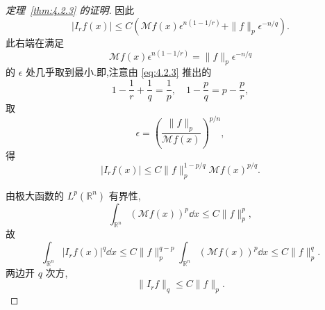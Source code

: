 \begin{proof}[定理~\ref{thm:4.2.3} 的证明]
因此
\begin{equation}
|I_{r}f(x)| \leq C\left(\mathcal{M}f(x)\epsilon^{n(1-1/r)} + \|f\|_{p}\epsilon^{-n/q}\right).\tag{4.2.5}
\label{eq:4.2.5}\end{equation}
此右端在满足
\begin{equation*}
\mathcal{M}f(x)\epsilon^{n(1-1/r)} = \|f\|_{p}\epsilon^{-n/q}
\end{equation*}
的 $\epsilon$ 处几乎取到最小.即,注意由 \eqref{eq:4.2.3} 推出的
\begin{equation*}
1 - \frac{1}{r} + \frac{1}{q} = \frac{1}{p}, \quad 1 - \frac{p}{q} = p - \frac{p}{r},
\end{equation*}
取
\begin{equation*}
\epsilon = \left(\frac{\|f\|_{p}}{\mathcal{M}f(x)}\right)^{p/n},
\end{equation*}
得
\begin{equation}
|I_{r}f(x)| \leq C\|f\|_{p}^{1-p/q}\mathcal{M}f(x)^{p/q}.\tag{4.2.6}
\label{eq:4.2.6}\end{equation}

由极大函数的 $L^{p}(\mathbb{R}^{n})$ 有界性,
\begin{equation*}
\int_{\mathbb{R}^{n}}(\mathcal{M}f(x))^{p}\dd x \leq C\|f\|_{p}^{p},
\end{equation*}
故
\begin{equation*}
\int_{\mathbb{R}^{n}}|I_{r}f(x)|^{q}\dd x \leq C\|f\|_{p}^{q-p}\int_{\mathbb{R}^{n}}(\mathcal{M}f(x))^{p}\dd x \leq C\|f\|_{p}^{q}.
\end{equation*}
两边开 $q$ 次方,
\begin{equation*}
\|I_{r}f\|_{q} \leq C\|f\|_{p}.
\end{equation*}
\end{proof}
